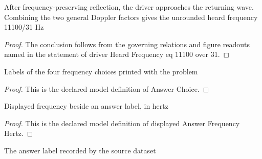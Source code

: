 \begin{lemma}
  \label{lem:physics:phyx-mini-0197:phyxminiproblems-problemphyxmini0197-driverheardfrequency-eq-11100-over-31}
  After frequency-preserving reflection, the driver approaches the returning wave. Combining the two general Doppler factors gives the unrounded heard frequency 11100/31 Hz
\end{lemma}
\begin{proof}
  The conclusion follows from the governing relations and figure readouts named in the statement of driver Heard Frequency eq 11100 over 31.
\end{proof}
\begin{definition}
  \label{def:physics:phyx-mini-0197:phyxminiproblems-problemphyxmini0197-answerchoice}
  Labels of the four frequency choices printed with the problem
\end{definition}
\begin{proof}
  This is the declared model definition of Answer Choice.
\end{proof}
\begin{definition}
  \label{def:physics:phyx-mini-0197:phyxminiproblems-problemphyxmini0197-displayedanswerfrequencyhertz}
  Displayed frequency beside an answer label, in hertz
\end{definition}
\begin{proof}
  This is the declared model definition of displayed Answer Frequency Hertz.
\end{proof}
\begin{definition}
  \label{def:physics:phyx-mini-0197:phyxminiproblems-problemphyxmini0197-recordeddatasetanswer}
  The answer label recorded by the source dataset
\end{definition}
